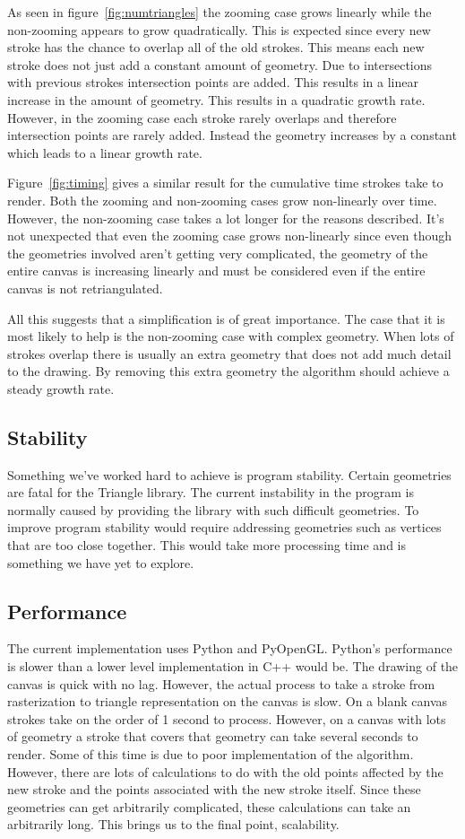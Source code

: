 \documentclass[review]{acmsiggraph}
\begin{document}
As seen in figure~\ref{fig:numtriangles} the zooming case grows linearly while the non-zooming
appears to grow quadratically. This is expected since every new stroke has the chance to overlap
all of the old strokes. This means each new stroke does not just add a constant amount of geometry.
Due to intersections with previous strokes intersection points are added. This results in a linear
increase in the amount of geometry. This results
in a quadratic growth rate. However, in the zooming case each stroke rarely overlaps and therefore
intersection points are rarely added. Instead the geometry increases by a constant which leads to
a linear growth rate.

Figure~\ref{fig:timing} gives a similar result for the cumulative time strokes take to render. Both
the zooming and non-zooming cases grow non-linearly over time. However, the non-zooming case takes
a lot longer for the reasons described. It's not unexpected that even the zooming case grows non-linearly
since even though the geometries involved aren't getting very complicated, the geometry of the entire
canvas is increasing linearly and must be considered even if the entire canvas is not retriangulated.

All this suggests that a simplification is of great importance.
The case that it is most likely to help is the non-zooming case with complex geometry. When lots of strokes
overlap there is usually an extra geometry that does not add much detail to the drawing. By removing
this extra geometry the algorithm should achieve a steady growth rate.

\subsection{Stability}
Something we've worked hard to achieve is program stability. Certain geometries are fatal
for the Triangle library. The current instability in the program is normally caused by
providing the library with such difficult geometries. To improve program stability would
require addressing geometries such as vertices that are too close together. This would
take more processing time and is something we have yet to explore.

\subsection{Performance}
The current implementation uses Python and PyOpenGL. Python's performance is slower than
a lower level implementation in C++ would be. The drawing of the canvas is quick with
no lag. However, the actual process to take a stroke from rasterization to triangle
representation on the canvas is slow. On a blank canvas strokes take on the order of
1 second to process. However, on a canvas with lots of geometry a stroke that covers
that geometry can take several seconds to render. Some of this time is due to poor
implementation of the algorithm. However, there are lots of calculations
to do with the old points affected by the new stroke and the points associated with the
new stroke itself. Since these geometries can get arbitrarily complicated, these
calculations can take an arbitrarily long. This brings us to the final point, scalability.
\end{document}
